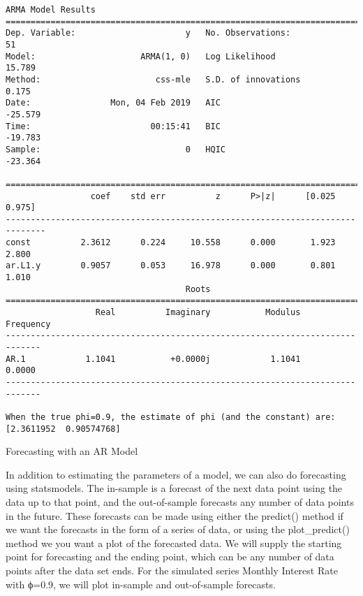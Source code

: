 \documentclass[11pt]{article}
\begin{document}
    \begin{Verbatim}[commandchars=\\\{\}]
                              ARMA Model Results                              
==============================================================================
Dep. Variable:                      y   No. Observations:                   51
Model:                     ARMA(1, 0)   Log Likelihood                  15.789
Method:                       css-mle   S.D. of innovations              0.175
Date:                Mon, 04 Feb 2019   AIC                            -25.579
Time:                        00:15:41   BIC                            -19.783
Sample:                             0   HQIC                           -23.364
                                                                              
==============================================================================
                 coef    std err          z      P>|z|      [0.025      0.975]
------------------------------------------------------------------------------
const          2.3612      0.224     10.558      0.000       1.923       2.800
ar.L1.y        0.9057      0.053     16.978      0.000       0.801       1.010
                                    Roots                                    
=============================================================================
                  Real          Imaginary           Modulus         Frequency
-----------------------------------------------------------------------------
AR.1            1.1041           +0.0000j            1.1041            0.0000
-----------------------------------------------------------------------------

When the true phi=0.9, the estimate of phi (and the constant) are:
[2.3611952  0.90574768]

    \end{Verbatim}

    Forecasting with an AR Model

In addition to estimating the parameters of a model, we can also do
forecasting using statsmodels. The in-sample is a forecast of the next
data point using the data up to that point, and the out-of-sample
forecasts any number of data points in the future. These forecasts can
be made using either the predict() method if we want the forecasts in
the form of a series of data, or using the plot\_predict() method we you
want a plot of the forecasted data. We will supply the starting point
for forecasting and the ending point, which can be any number of data
points after the data set ends. For the simulated series Monthly
Interest Rate with ϕ=0.9, we will plot in-sample and out-of-sample
forecasts.
\end{document}
